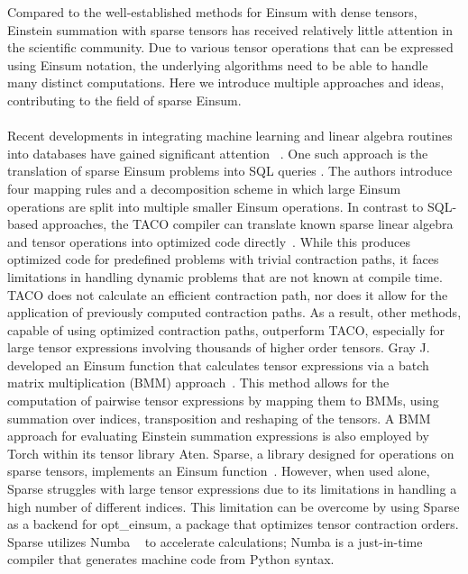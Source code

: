 Compared to the well-established methods for Einsum with dense tensors, Einstein summation with
sparse tensors has received relatively little attention in the scientific community.
Due to various tensor operations that can be expressed using Einsum notation, the
underlying algorithms need to be able to handle many distinct computations. Here we
introduce multiple approaches and ideas, contributing to the field of sparse Einsum.
\\
\\
Recent developments in integrating machine learning and linear algebra routines into
databases have gained significant attention
~\cite{Machine_Learning_LinA_and_More, du2020inmachinelearningdatabasereimaginingdeep,
       data_management_in_machine_learning, deepdive}.
One such approach is the translation of sparse Einsum problems into SQL queries
\cite{sql_einsum}. The authors introduce four mapping rules and a decomposition scheme
in which large Einsum operations are split into multiple smaller Einsum operations.
In contrast to SQL-based approaches, the TACO compiler can translate known sparse linear
algebra and tensor operations into optimized code directly~\cite{taco}. While this produces
optimized code for predefined problems with trivial contraction paths, it faces limitations
in handling dynamic problems that are not known at compile time. TACO does not calculate
an efficient contraction path, nor does it allow for the application of previously computed
contraction paths. As a result, other methods, capable of using optimized contraction paths,
outperform TACO, especially for large tensor expressions involving thousands of higher order tensors.
Gray J. developed an Einsum function that calculates tensor expressions via a batch matrix
multiplication (BMM) approach~\cite{jcmgray}. This method allows for the computation of pairwise
tensor expressions by mapping them to BMMs, using summation over indices, transposition
and reshaping of the tensors. A BMM approach for evaluating Einstein summation expressions
is also employed by Torch within its tensor library Aten. Sparse, a library designed for
operations on sparse tensors, implements an Einsum function~\cite{sparse}. However, when used
alone, Sparse struggles with large tensor expressions due to its limitations in handling a high
number of different indices. This limitation can be overcome by using Sparse as a backend for
opt\_einsum, a package that optimizes tensor contraction orders. Sparse utilizes Numba
~\cite{lam2015numba} to accelerate calculations; Numba is a just-in-time compiler that generates
machine code from Python syntax.